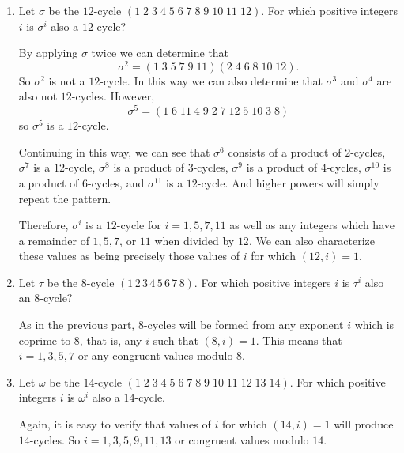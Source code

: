 \begin{enumerate}
\item Let $\sigma$ be the $12$-cycle
  $(1\;2\;3\;4\;5\;6\;7\;8\;9\;10\;11\;12)$. For which positive
  integers $i$ is $\sigma^i$ also a $12$-cycle?
  \begin{solution}
    By applying $\sigma$ twice we can determine that
    \begin{equation*}
      \sigma^2 = (1\;3\;5\;7\;9\;11)(2\;4\;6\;8\;10\;12).
    \end{equation*}
    So $\sigma^2$ is not a $12$-cycle. In this way we can also
    determine that $\sigma^3$ and $\sigma^4$ are also not
    $12$-cycles. However,
    \begin{equation*}
      \sigma^5 = (1\;6\;11\;4\;9\;2\;7\;12\;5\;10\;3\;8)
    \end{equation*}
    so $\sigma^5$ is a $12$-cycle.

    Continuing in this way, we can see that $\sigma^6$ consists of a
    product of $2$-cycles, $\sigma^7$ is a $12$-cycle, $\sigma^8$ is a
    product of $3$-cycles, $\sigma^9$ is a product of $4$-cycles,
    $\sigma^{10}$ is a product of $6$-cycles, and $\sigma^{11}$ is a
    $12$-cycle. And higher powers will simply repeat the pattern.

    Therefore, $\sigma^i$ is a $12$-cycle for $i = 1,5,7,11$ as well
    as any integers which have a remainder of $1,5,7$, or $11$ when
    divided by $12$. We can also characterize these values as being
    precisely those values of $i$ for which $(12,i) = 1$.
  \end{solution}
\item Let $\tau$ be the $8$-cycle $(1\,2\,3\,4\,5\,6\,7\,8)$. For
  which positive integers $i$ is $\tau^i$ also an $8$-cycle?
  \begin{solution}
    As in the previous part, $8$-cycles will be formed from any
    exponent $i$ which is coprime to $8$, that is, any $i$ such that
    $(8,i) = 1$. This means that $i = 1,3,5,7$ or any congruent values
    modulo $8$.
  \end{solution}
\item Let $\omega$ be the $14$-cycle
  $(1\;2\;3\;4\;5\;6\;7\;8\;9\;10\;11\;12\;13\;14)$. For which
  positive integers $i$ is $\omega^i$ also a $14$-cycle.
  \begin{solution}
    Again, it is easy to verify that values of $i$ for which
    $(14,i) = 1$ will produce $14$-cycles. So $i = 1,3,5,9,11,13$ or
    congruent values modulo $14$.
  \end{solution}
\end{enumerate}

